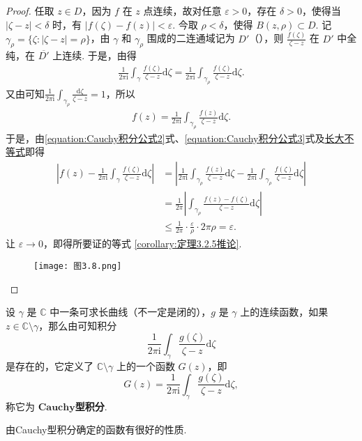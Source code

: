 \documentclass[../../main.tex]{subfiles}
\begin{document}
\begin{proof}
任取 \( z \in D \)，因为 \( f \) 在 \( z \) 点连续，故对任意 \( \varepsilon > 0 \)，存在 \( \delta > 0 \)，使得当 \( |\zeta - z| < \delta \) 时，有 \( |f(\zeta) - f(z)| < \varepsilon \). 今取 \( \rho < \delta \)，使得 \( B(z, \rho) \subset D \). 记 \( \gamma_{\rho} = \{\zeta: |\zeta - z| = \rho\} \)，由 \( \gamma \) 和 \( \gamma_{\rho} \) 围成的二连通域记为 \( D' \)（），则 \( \frac{f(\zeta)}{\zeta - z} \) 在 \( D' \) 中全纯，在 \( \overline{D'} \) 上连续. 于是，由得
\begin{align}\label{equation:Cauchy积分公式2}
\frac{1}{2\pi \mathrm{i}} \int_{\gamma} \frac{f(\zeta)}{\zeta - z} \mathrm{d}\zeta = \frac{1}{2\pi \mathrm{i}} \int_{\gamma_{\rho}} \frac{f(\zeta)}{\zeta - z} \mathrm{d}\zeta.
\end{align}
又由可知\( \frac{1}{2\pi \mathrm{i}} \int_{\gamma_{\rho}} \frac{\mathrm{d}\zeta}{\zeta - z} = 1 \)，所以
\begin{align}
f(z) = \frac{1}{2\pi \mathrm{i}} \int_{\gamma_{\rho}} \frac{f(z)}{\zeta - z} \mathrm{d}\zeta. \label{equation:Cauchy积分公式3}
\end{align}
于是，由\eqref{equation:Cauchy积分公式2}式、\eqref{equation:Cauchy积分公式3}式及\hyperref[proposition:长大不等式]{长大不等式}即得
\begin{align*}
\left| f(z) - \frac{1}{2\pi \mathrm{i}} \int_{\gamma} \frac{f(\zeta)}{\zeta - z} \mathrm{d}\zeta \right| 
&= \left| \frac{1}{2\pi \mathrm{i}} \int_{\gamma_{\rho}} \frac{f(z)}{\zeta - z} \mathrm{d}\zeta - \frac{1}{2\pi \mathrm{i}} \int_{\gamma_{\rho}} \frac{f(\zeta)}{\zeta - z} \mathrm{d}\zeta \right| \\
&= \frac{1}{2\pi} \left| \int_{\gamma_{\rho}} \frac{f(z) - f(\zeta)}{\zeta - z} \mathrm{d}\zeta \right| \\
& \leqslant \frac{1}{2\pi} \cdot \frac{\varepsilon}{\rho} \cdot 2\pi \rho = \varepsilon.
\end{align*}
让 \( \varepsilon \to 0 \)，即得所要证的等式 \eqref{corollary:定理3.2.5推论}. 
\begin{figure}[H]
\centering
\texttt{[image: 图3.8.png]}
\caption{}
\label{figure:图3.8}
\end{figure}
\end{proof}

\begin{definition}
设 \( \gamma \) 是 \( \mathbb{C} \) 中一条可求长曲线（不一定是闭的），\( g \) 是 \( \gamma \) 上的连续函数，如果 \( z \in \mathbb{C} \setminus \gamma \)，那么由可知积分
\[
\frac{1}{2\pi \mathrm{i}} \int_{\gamma} \frac{g(\zeta)}{\zeta - z} \mathrm{d}\zeta
\]
是存在的，它定义了 \( \mathbb{C} \setminus \gamma \) 上的一个函数 \( G(z) \)，即
\[
G(z) = \frac{1}{2\pi \mathrm{i}} \int_{\gamma} \frac{g(\zeta)}{\zeta - z} \mathrm{d}\zeta,
\]
称它为 $\mathbf{Cauchy}$\textbf{型积分}. 
\end{definition}
\begin{note}
由Cauchy型积分确定的函数有很好的性质. 
\end{note}
\end{document}
